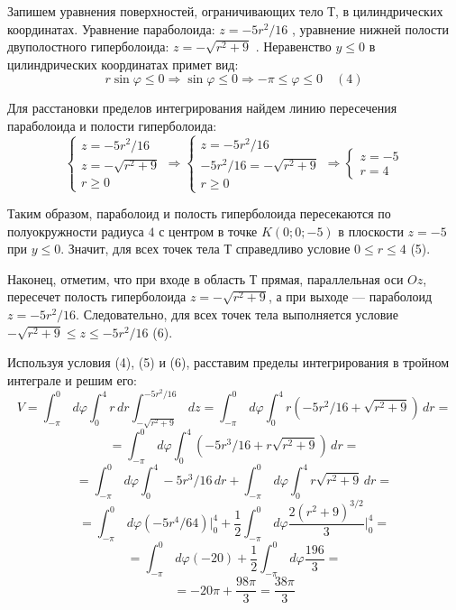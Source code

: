 \documentclass[12pt]{article}
\begin{document}
\begin{enumerate}[wide, labelwidth=!, labelindent=0pt]
		Запишем уравнения поверхностей, ограничивающих тело $Т$, в цилиндрических координатах. Уравнение параболоида: $z = -5r^2/16 $ , уравнение нижней полости двуполостного гиперболоида: $z=-\sqrt{r^2 + 9}$ . Неравенство $y\leq 0$ в цилиндрических координатах примет вид: 
		$$r\sin\varphi \leq 0 \Rightarrow \sin \varphi \leq 0 \Rightarrow - \pi \leq \varphi \leq 0\quad(4)$$ 
		
		Для расстановки пределов интегрирования найдем линию пересечения параболоида и полости гиперболоида:
		\begin{equation*}	 
			\begin{cases}
				z = -5r^2/16\\
				z=-\sqrt{r^2 + 9}\\
				r \geq 0
			\end{cases}
			\Rightarrow
			\begin{cases}
				z = -5r^2/16\\
				-5r^2/16=-\sqrt{r^2 + 9}\\
				r \geq 0
			\end{cases}
			\Rightarrow
			\begin{cases}
				z = -5\\
				r=4
			\end{cases}
		\end{equation*}
		
		Таким образом, параболоид и полость гиперболоида пересекаются по полуокружности радиуса $4$ с центром в точке $K(0;0;-5)$ в плоскости $z = -5$ при $y \leq 0$. Значит, для всех точек тела $Т$ справедливо условие $0 \leq r \leq 4$	(5). 
		
		Наконец, отметим, что при входе в область $Т$ прямая, параллельная оси $Oz$, пересечет полость гиперболоида $ z=-\sqrt{r^2 + 9} $, а при выходе --- параболоид $ z = -5r^2/16 $. Следовательно, для всех точек тела выполняется условие $ -\sqrt{r^2 + 9} \leq z \leq  -5r^2/16 $ (6). 
		
		Используя условия	(4), (5) и (6), расставим пределы интегрирования в тройном интеграле и решим его:			
		$$ V = \int_{- \pi}^{0} \,d \varphi \int_{0}^{4} r \,d r \int_{-\sqrt{r^2 + 9}}^{-5r^2/16} \,d z = \int_{- \pi}^{0} \,d \varphi \int_{0}^{4} r(-5r^2/16 +\sqrt{r^2 + 9}) \,d r  = $$
		$$ = \int_{- \pi}^{0} \,d \varphi \int_{0}^{4} (-5r^3/16 +r\sqrt{r^2 + 9}) \,d r = $$
		$$ = \int_{- \pi}^{0} \,d \varphi \int_{0}^{4} -5r^3/16 \,d r + \int_{- \pi}^{0} \,d \varphi \int_{0}^{4}r\sqrt{r^2 + 9} \,d r = $$
		$$ = \int_{- \pi}^{0} \,d \varphi  (-5r^4/64) \Big|_0^{4}  + \frac{1}{2} \int_{- \pi}^{0} \,d \varphi \frac{2(r^2 + 9)^{3/2}}{3} \Big|_0^{4} =$$
		$$ = \int_{- \pi}^{0} \,d \varphi(-20)  + \frac{1}{2} \int_{- \pi}^{0} \,d \varphi \frac{196}{3} = $$
		$$ = -20\pi + \frac{98\pi}{3} = \frac{38\pi}{3} $$


\end{enumerate}
\end{document}
